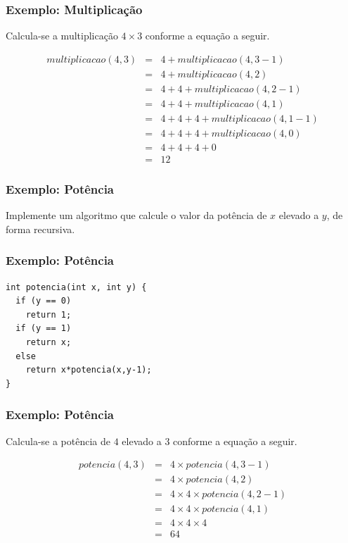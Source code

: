\documentclass[aspectratio=169]{beamer}
\begin{document}
\begin{frame}[fragile]
\frametitle{Exemplo: Multiplicação}
Calcula-se a multiplicação $4 \times 3$ conforme a equação a seguir.

\begin{eqnarray}
 multiplicacao(4,3)&=& 4 + multiplicacao(4,3-1) \nonumber \\
                &=& 4 + multiplicacao(4,2) \nonumber \\
	        &=& 4 + 4 + multiplicacao(4,2-1) \nonumber \\
	        &=& 4 + 4 + multiplicacao(4,1) \nonumber \\
	        &=& 4 + 4 + 4 + multiplicacao(4,1-1) \nonumber \\
	        &=& 4 + 4 + 4 + multiplicacao(4,0) \nonumber \\ 
	        &=& 4 + 4 + 4 + 0 \nonumber \\
	        &=& 12 \nonumber
\end{eqnarray}
\end{frame}


\begin{frame}
\frametitle{Exemplo: Potência}
Implemente um algoritmo que calcule o valor da potência de $x$ elevado a $y$, de forma recursiva.
\end{frame}


\begin{frame}[fragile]
\frametitle{Exemplo: Potência}
\begin{lstlisting}
int potencia(int x, int y) {
  if (y == 0)
    return 1;  
  if (y == 1)
    return x;
  else 
    return x*potencia(x,y-1);
}
\end{lstlisting}
\end{frame}


\begin{frame}[fragile]
\frametitle{Exemplo: Potência}
Calcula-se a potência de $4$ elevado a $3$ conforme a equação a seguir.

\begin{eqnarray}
 potencia(4,3)&=& 4 \times potencia(4,3-1) \nonumber \\
                &=& 4 \times potencia(4,2) \nonumber \\
	        &=& 4 \times 4 \times potencia(4,2-1) \nonumber \\
	        &=& 4 \times 4 \times potencia(4,1) \nonumber \\
	        &=& 4 \times 4 \times 4 \nonumber \\
	        &=& 64 \nonumber
\end{eqnarray}
\end{frame}
\end{document}
